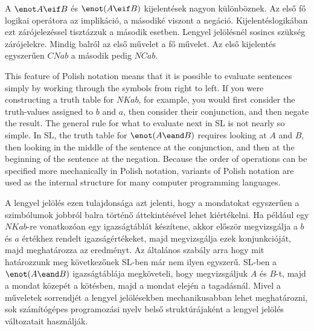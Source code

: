 A $\enot A\eif B$ és $\enot (A\eif B)$ kijelentések nagyon különböznek. Az első fő logikai operátora az implikáció, a másodiké viszont a negáció. Kijelentéslogikában ezt zárójelezéssel tisztázzuk a második esetben. Lengyel jelölésnél sosincs szükség zárójelekre. Mindig balról az első művelet a fő művelet. Az első kijelentés egyszerűen $CNab$ a második pedig $NCab$.




This feature of Polish notation means that it is possible to evaluate sentences simply by working through the symbols from right to left. If you were constructing a truth table for $NKab$, for example, you would first consider the truth-values assigned to $b$ and $a$, then consider their conjunction, and then negate the result. The general rule for what to evaluate next in SL is not nearly so simple. In SL, the truth table for $\enot(A\eand B)$ requires looking at $A$ and $B$, then looking in the middle of the sentence at the conjunction, and then at the beginning of the sentence at the negation. Because the order of operations can be specified more mechanically in Polish notation, variants of Polish notation are used as the internal structure for many computer programming languages.

A lengyel jelölés ezen tulajdonsága azt jelenti, hogy a mondatokat egyszerűen a szimbólumok jobbról balra történő áttekintésével lehet kiértékelni. Ha például egy $NKab$-re vonatkozóan egy igazságtáblát készítene, akkor először megvizsgálja a $b$ és $a$ értékhez rendelt igazságértékeket, majd megvizsgálja ezek konjunkcióját, majd meghatározza az eredményt. Az általános szabály arra hogy mit határozzunk meg következőnek SL-ben már nem ilyen egyszerű. SL-ben a $\enot(A\eand B)$ igazságtáblája megköveteli, hogy megvizsgáljuk $A$ és $B$-t, majd a mondat közepét a kötésben, majd a mondat elején a tagadásnál. Mivel a műveletek sorrendjét a lengyel jelölésekben mechanikusabban lehet meghatározni, sok számítógépes programozási nyelv belső struktúrájaként a lengyel jelölés változatait használják.

